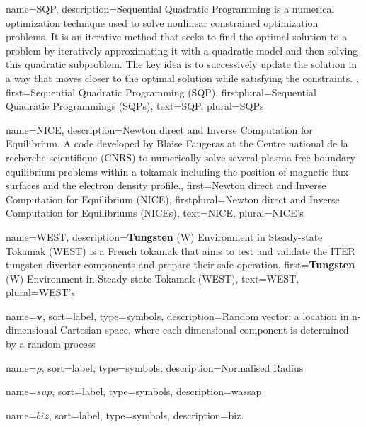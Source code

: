{%
  name={SQP},%
  description={Sequential Quadratic Programming is a numerical optimization technique used to solve nonlinear constrained optimization problems. It is an iterative method that seeks to find the optimal solution to a problem by iteratively approximating it with a quadratic model and then solving this quadratic subproblem. The key idea is to successively update the solution in a way that moves closer to the optimal solution while satisfying the constraints.
},%
  first={Sequential Quadratic Programming (SQP)},%
  firstplural={Sequential Quadratic Programmings (SQPs)},%
  text={SQP},%
  plural={SQPs}%
}


{%
  name={NICE},%
  description={Newton direct and Inverse Computation for Equilibrium. A code developed by Blaise Faugeras at the Centre national de la recherche scientifique (CNRS) to numerically solve several plasma free-boundary equilibrium problems within a tokamak including the position of magnetic flux surfaces and the electron density profile.},%
  first={Newton direct and Inverse Computation for Equilibrium (NICE)},%
  firstplural={Newton direct and Inverse Computation for Equilibriums (NICEs)},%
  text={NICE},%
  plural={NICE's}%
}

{%
  name={WEST},%
  description={\textbf{Tungsten} (W) Environment in Steady-state Tokamak (WEST) is a French tokamak that aims to test and validate the ITER tungsten divertor components and prepare their safe operation},%
  first={\textbf{Tungsten} (W) Environment in Steady-state Tokamak (WEST)},%
  text={WEST},%
  plural={WEST's}%
}


{
name={$\mathbf{v}$},
sort={label},
type=symbols,
description={Random vector: a location in n-dimensional Cartesian space, where each dimensional component is determined by a random process}
}

{
name={$\rho$},
sort={label},
type=symbols,
description={Normalised Radius}
}

{
name={$sup$},
sort={label},
type=symbols,
description={wassap}
}

{
name={$biz$},
sort={label},
type=symbols,
description={biz}
}
